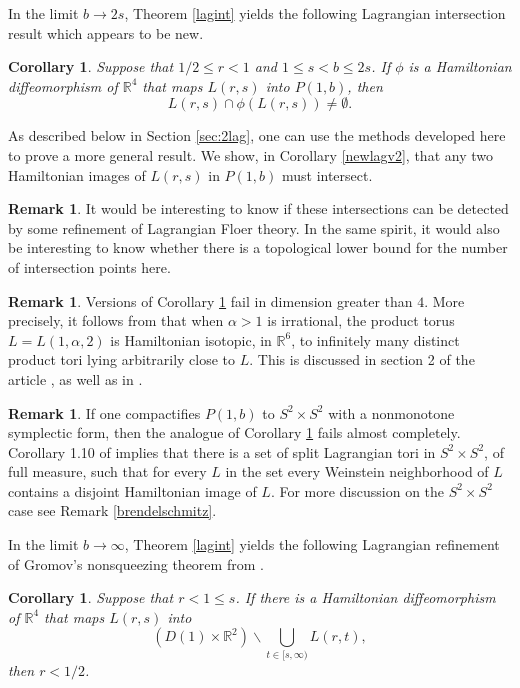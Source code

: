 \documentclass[12pt]{amsart}
\newtheorem{corollary}[theorem]{Corollary}
\theoremstyle{definition}
\newtheorem{remark}[theorem]{Remark}
\newcommand{\RR}{{\mathbb R}}
\begin{document}
In the limit $b\to 2s$, Theorem \ref{lagint} yields the following Lagrangian intersection result which appears to be new. 

\begin{corollary}\label{newlag}
Suppose that $1/2\leq r<1$ and $1 \leq s <b \le 2s$. If $\phi$ is a Hamiltonian diffeomorphism of $\RR^4$ that maps $L(r,s)$ into $P(1,b)$, then $$L(r,s) \cap \phi(L(r,s)) \neq \emptyset.$$
\end{corollary}


As described below in Section \ref{sec:2lag}, one can use the methods developed here to prove a more general result. We show, in Corollary \ref{newlagv2}, that any two Hamiltonian images of $L(r,s)$ in $P(1,b)$ must intersect.


\begin{remark}
It would be interesting to know if these intersections can be detected by some refinement of Lagrangian Floer theory. In the same spirit, it would also be interesting to know whether there is a topological lower bound for the number of intersection points here.
\end{remark}



\begin{remark}
Versions of Corollary \ref{newlag} fail in dimension greater than $4$. More precisely, it follows from \cite[Theorem A]{chek} that when $\alpha>1$ is irrational, the product torus $L=L(1, \alpha, 2)$ is Hamiltonian isotopic, in $\RR^6$, to infinitely many distinct product tori lying arbitrarily close to $L$. This is discussed in section 2 of the article \cite{atallah}, as well as in \cite{brsh}. 
\end{remark}

\begin{remark} If one compactifies $P(1,b)$ to $S^2 \times S^2$ with a nonmonotone symplectic form, then the analogue of Corollary \ref{newlag} fails almost completely. Corollary 1.10 of \cite{brki} implies that there is a set of split Lagrangian tori in $S^2 \times S^2$, of full measure, such that for every $L$ in the set every Weinstein neighborhood of $L$ contains a disjoint Hamiltonian image of $L$. For more discussion on the $S^2 \times S^2$ case see Remark \ref{brendelschmitz}.
    
\end{remark}


\medskip

In the limit $b\to \infty$, Theorem \ref{lagint} yields  the following Lagrangian refinement of Gromov's nonsqueezing theorem from \cite{gr}.
\begin{corollary}\label{binf}
   Suppose that $r<1 \le s$. If there is a Hamiltonian diffeomorphism of $\RR^4$ that maps $L(r,s)$ into 
   $$(D(1) \times \RR^2) \smallsetminus \bigcup_{t \in [s,\infty)} L(r, t),$$ then $r <1/2$.
\end{corollary}
\end{document}
